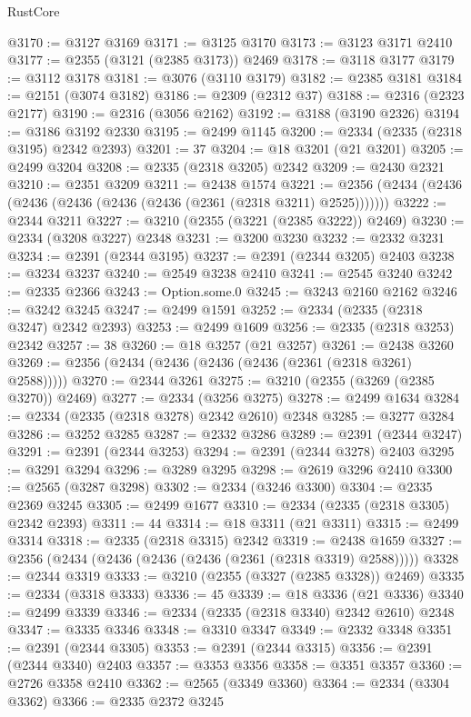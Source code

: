 \begin{lexlean}{RustCore}
\begin{coremodule}
@3170 := @3127 @3169
@3171 := @3125 @3170
@3173 := @3123 @3171 @2410
@3177 := @2355 (@3121 (@2385 @3173)) @2469
@3178 := @3118 @3177
@3179 := @3112 @3178
@3181 := @3076 (@3110 @3179)
@3182 := @2385 @3181
@3184 := @2151 (@3074 @3182)
@3186 := @2309 (@2312 @37)
@3188 := @2316 (@2323 @2177)
@3190 := @2316 (@3056 @2162)
@3192 := @3188 (@3190 @2326)
@3194 := @3186 @3192 @2330
@3195 := @2499 @1145
@3200 := @2334 (@2335 (@2318 @3195) @2342 @2393)
@3201 := 37
@3204 := @18 @3201 (@21 @3201)
@3205 := @2499 @3204
@3208 := @2335 (@2318 @3205) @2342
@3209 := @2430 @2321
@3210 := @2351 @3209
@3211 := @2438 @1574
@3221 := @2356 (@2434 (@2436 (@2436 (@2436 (@2436 (@2436 (@2361 (@2318 @3211) @2525)))))))
@3222 := @2344 @3211
@3227 := @3210 (@2355 (@3221 (@2385 @3222)) @2469)
@3230 := @2334 (@3208 @3227) @2348
@3231 := @3200 @3230
@3232 := @2332 @3231
@3234 := @2391 (@2344 @3195)
@3237 := @2391 (@2344 @3205) @2403
@3238 := @3234 @3237
@3240 := @2549 @3238 @2410
@3241 := @2545 @3240
@3242 := @2335 @2366
@3243 := Option.some.{0}
@3245 := @3243 @2160 @2162
@3246 := @3242 @3245
@3247 := @2499 @1591
@3252 := @2334 (@2335 (@2318 @3247) @2342 @2393)
@3253 := @2499 @1609
@3256 := @2335 (@2318 @3253) @2342
@3257 := 38
@3260 := @18 @3257 (@21 @3257)
@3261 := @2438 @3260
@3269 := @2356 (@2434 (@2436 (@2436 (@2436 (@2361 (@2318 @3261) @2588)))))
@3270 := @2344 @3261
@3275 := @3210 (@2355 (@3269 (@2385 @3270)) @2469)
@3277 := @2334 (@3256 @3275)
@3278 := @2499 @1634
@3284 := @2334 (@2335 (@2318 @3278) @2342 @2610) @2348
@3285 := @3277 @3284
@3286 := @3252 @3285
@3287 := @2332 @3286
@3289 := @2391 (@2344 @3247)
@3291 := @2391 (@2344 @3253)
@3294 := @2391 (@2344 @3278) @2403
@3295 := @3291 @3294
@3296 := @3289 @3295
@3298 := @2619 @3296 @2410
@3300 := @2565 (@3287 @3298)
@3302 := @2334 (@3246 @3300)
@3304 := @2335 @2369 @3245
@3305 := @2499 @1677
@3310 := @2334 (@2335 (@2318 @3305) @2342 @2393)
@3311 := 44
@3314 := @18 @3311 (@21 @3311)
@3315 := @2499 @3314
@3318 := @2335 (@2318 @3315) @2342
@3319 := @2438 @1659
@3327 := @2356 (@2434 (@2436 (@2436 (@2436 (@2361 (@2318 @3319) @2588)))))
@3328 := @2344 @3319
@3333 := @3210 (@2355 (@3327 (@2385 @3328)) @2469)
@3335 := @2334 (@3318 @3333)
@3336 := 45
@3339 := @18 @3336 (@21 @3336)
@3340 := @2499 @3339
@3346 := @2334 (@2335 (@2318 @3340) @2342 @2610) @2348
@3347 := @3335 @3346
@3348 := @3310 @3347
@3349 := @2332 @3348
@3351 := @2391 (@2344 @3305)
@3353 := @2391 (@2344 @3315)
@3356 := @2391 (@2344 @3340) @2403
@3357 := @3353 @3356
@3358 := @3351 @3357
@3360 := @2726 @3358 @2410
@3362 := @2565 (@3349 @3360)
@3364 := @2334 (@3304 @3362)
@3366 := @2335 @2372 @3245

\end{coremodule}
\end{lexlean}
